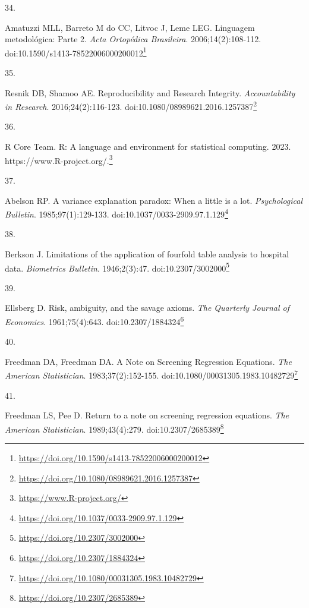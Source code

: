 \documentclass[
  a4paper,
]{book}
\newlength{\cslhangindent}
\newlength{\csllabelwidth}
\newlength{\cslentryspacingunit} %
\newenvironment{CSLReferences}[2] %
 {%
  \setlength{\parindent}{0pt}
  \ifodd #1
  \let\oldpar\par
  \def\par{\hangindent=\cslhangindent\oldpar}
  \fi
  \setlength{\parskip}{#2\cslentryspacingunit}
 }%
 {}
\newcommand{\CSLLeftMargin}[1]{\parbox[t]{\csllabelwidth}{#1}}
\newcommand{\CSLRightInline}[1]{\parbox[t]{\linewidth - \csllabelwidth}{#1}\break}
\renewcommand{\href}[2]{#2\footnote{\url{#1}}}
\begin{document}
\begin{CSLReferences}{0}{0}
\leavevmode{}%
\CSLLeftMargin{34. }%
\CSLRightInline{Amatuzzi MLL, Barreto M do CC, Litvoc J, Leme LEG. Linguagem metodológica: Parte 2. \emph{Acta Ortopédica Brasileira}. 2006;14(2):108-112. doi:\href{https://doi.org/10.1590/s1413-78522006000200012}{10.1590/s1413-78522006000200012}}

\leavevmode{}%
\CSLLeftMargin{35. }%
\CSLRightInline{Resnik DB, Shamoo AE. Reproducibility and Research Integrity. \emph{Accountability in Research}. 2016;24(2):116-123. doi:\href{https://doi.org/10.1080/08989621.2016.1257387}{10.1080/08989621.2016.1257387}}

\leavevmode{}%
\CSLLeftMargin{36. }%
\CSLRightInline{R Core Team. R: A language and environment for statistical computing. 2023. \href{https://www.R-project.org/}{https://www.R-project.org/.}}

\leavevmode{}%
\CSLLeftMargin{37. }%
\CSLRightInline{Abelson RP. A variance explanation paradox: When a little is a lot. \emph{Psychological Bulletin}. 1985;97(1):129-133. doi:\href{https://doi.org/10.1037/0033-2909.97.1.129}{10.1037/0033-2909.97.1.129}}

\leavevmode{}%
\CSLLeftMargin{38. }%
\CSLRightInline{Berkson J. Limitations of the application of fourfold table analysis to hospital data. \emph{Biometrics Bulletin}. 1946;2(3):47. doi:\href{https://doi.org/10.2307/3002000}{10.2307/3002000}}

\leavevmode{}%
\CSLLeftMargin{39. }%
\CSLRightInline{Ellsberg D. Risk, ambiguity, and the savage axioms. \emph{The Quarterly Journal of Economics}. 1961;75(4):643. doi:\href{https://doi.org/10.2307/1884324}{10.2307/1884324}}

\leavevmode{}%
\CSLLeftMargin{40. }%
\CSLRightInline{Freedman DA, Freedman DA. A Note on Screening Regression Equations. \emph{The American Statistician}. 1983;37(2):152-155. doi:\href{https://doi.org/10.1080/00031305.1983.10482729}{10.1080/00031305.1983.10482729}}

\leavevmode{}%
\CSLLeftMargin{41. }%
\CSLRightInline{Freedman LS, Pee D. Return to a note on screening regression equations. \emph{The American Statistician}. 1989;43(4):279. doi:\href{https://doi.org/10.2307/2685389}{10.2307/2685389}}


\end{CSLReferences}
\end{document}
